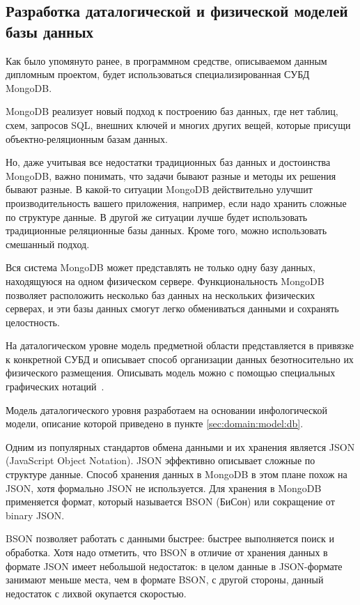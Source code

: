 \subsection{Разработка даталогической и физической моделей базы данных}
\label{sec:design:db}

Как было упомянуто ранее, в программном средстве, описываемом данным дипломным проектом, будет использоваться специализированная СУБД MongoDB.

MongoDB реализует новый подход к построению баз данных, где нет таблиц, схем, запросов SQL, внешних ключей и многих других вещей, которые присущи объектно-реляционным базам данных.

Но, даже учитывая все недостатки традиционных баз данных и достоинства MongoDB, важно понимать, что задачи бывают разные и методы их решения бывают разные. В какой-то ситуации MongoDB действительно улучшит производительность вашего приложения, например, если надо хранить сложные по структуре данные. В другой же ситуации лучше будет использовать традиционные реляционные базы данных. Кроме того, можно использовать смешанный подход.

Вся система MongoDB может представлять не только одну базу данных, находящуюся на одном физическом сервере. Функциональность \linebreak MongoDB позволяет расположить несколько баз данных на нескольких физических серверах, и эти базы данных смогут легко обмениваться данными и сохранять целостность.

На даталогическом уровне модель предметной области представляется в привязке к конкретной СУБД и описывает способ организации данных безотносительно их физического размещения. Описывать модель можно с помощью специальных графических нотаций~\cite{kulikov_db_workbook}. 

Модель даталогического уровня разработаем на основании инфологической модели, описание которой приведено в пункте \ref{sec:domain:model:db}. 

Одним из популярных стандартов обмена данными и их хранения является JSON (JavaScript Object Notation). JSON эффективно описывает сложные по структуре данные. Способ хранения данных в MongoDB в этом плане похож на JSON, хотя формально JSON не используется. Для хранения в MongoDB применяется формат, который называется BSON (БиСон) или сокращение от binary JSON.

BSON позволяет работать с данными быстрее: быстрее выполняется поиск и обработка. Хотя надо отметить, что BSON в отличие от хранения данных в формате JSON имеет небольшой недостаток: в целом данные в JSON-формате занимают меньше места, чем в формате BSON, с другой стороны, данный недостаток с лихвой окупается скоростью.

